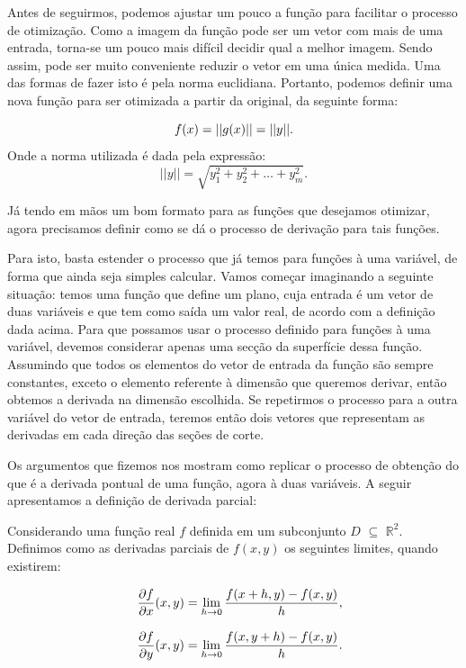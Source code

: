 Antes de seguirmos, podemos ajustar um pouco a função para facilitar o
processo de otimização. Como a imagem da função pode ser um vetor com
mais de uma entrada, torna-se um pouco mais difícil decidir qual a melhor
imagem. Sendo assim, pode ser muito conveniente reduzir o vetor em uma
única medida. Uma das formas de fazer isto é pela norma euclidiana.
Portanto, podemos definir uma nova função para ser otimizada a partir da
original, da seguinte forma:


\begin{equation}
        f(x) = ||g(x)|| = ||y||.\\
\end{equation}
        Onde a norma utilizada é dada pela expressão:
\begin{equation}
        ||y|| = \sqrt{ y_1^2 + y_2^2 + \hdots + y_m^2}.
\end{equation}

Já tendo em mãos um bom formato para as funções que desejamos otimizar, agora
precisamos definir como se dá o processo de derivação para tais funções.

Para isto, basta estender o processo que já temos para funções à uma variável,
de forma que ainda seja simples calcular. Vamos começar imaginando a seguinte
situação: temos uma função que define um plano, cuja entrada é um vetor de
duas variáveis e que tem como saída um valor real, de acordo com a definição
dada acima. Para que possamos usar o processo definido para funções à uma
variável, devemos considerar apenas uma secção da superfície dessa função.
Assumindo que todos os elementos do vetor de entrada da função são sempre
constantes, exceto o elemento referente à dimensão que queremos derivar,
então obtemos a derivada na dimensão escolhida. Se repetirmos o processo para
a outra variável do vetor de entrada, teremos então dois vetores que
representam as derivadas em cada direção das seções de corte.

Os argumentos que fizemos nos mostram como replicar o processo de obtenção do
que é a derivada pontual de uma função, agora à duas variáveis. A seguir
apresentamos a definição de derivada parcial:

\begin{definition}

    Considerando uma função real $f$ definida em um subconjunto $D$ $\subseteq$ \(\mathbb{R}^2\). Definimos como as derivadas parciais de $f(x, y)$ os seguintes limites, quando existirem:

    \begin{equation}
        \begin{array}{ccc}
            &   \displaystyle {\frac{\partial f}{\partial x}(x, y) = \lim\limits_{h \to 0} \frac{f(x+h, y) - f(x, y)}{h},}\\
            &\\
            &   \displaystyle {\frac{\partial f}{\partial y}(x, y) = \lim\limits_{h \to 0} \frac{f(x,y+h) - f(x,y)}{h}.}\\
        \end{array}
    \end{equation}

\end{definition}

